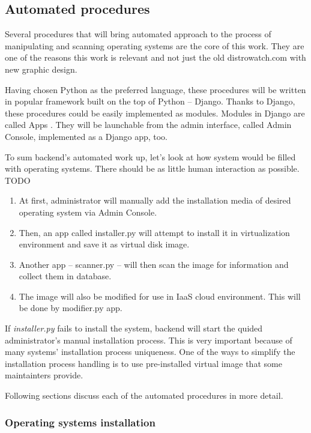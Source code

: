 \documentclass[thesis=B,english]{FITthesis}[2013/04/26]
\begin{document}
\subsection{Automated procedures}

Several procedures that will bring automated approach to the process of manipulating and scanning operating systems are the core of this work. They are one of the reasons this work is relevant and not just the old distrowatch.com with new graphic design.

Having chosen Python as the preferred language, these procedures will be written in popular framework built on the top of Python -- Django. Thanks to Django, these procedures could be easily implemented as modules. Modules in Django are called Apps \cite{TODO}. They will be launchable from the admin interface, called Admin Console, implemented as a Django app, too.

To sum backend's automated work up, let's look at how system would be filled with operating systems. There should be as little human interaction as possible. TODO 

\begin{enumerate}
	\item At first, administrator will manually add the installation media of desired operating system via Admin Console.
	\item Then, an app called installer.py will attempt to install it in virtualization environment and save it as virtual disk image.
	\item Another app -- scanner.py -- will then scan the image for information and collect them in database.
	\item The image will also be modified for use in IaaS cloud environment. This will be done by modifier.py app.
\end{enumerate}

If \emph{installer.py} fails to install the system, backend will start the quided administrator's manual installation process. This is very important because of many systems' installation process uniqueness. One of the ways to simplify the installation process handling is to use pre-installed virtual image that some maintainters provide.

Following sections discuss each of the automated procedures in more detail.

\subsubsection{Operating systems installation}
\end{document}
